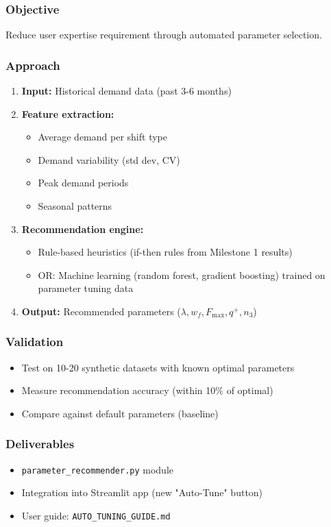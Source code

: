 \documentclass[11pt,letterpaper]{article}
\begin{document}
\subsubsection{Objective}
Reduce user expertise requirement through automated parameter selection.

\subsubsection{Approach}
\begin{enumerate}[leftmargin=*]
    \item \textbf{Input:} Historical demand data (past 3-6 months)
    \item \textbf{Feature extraction:}
    \begin{itemize}[leftmargin=*]
        \item Average demand per shift type
        \item Demand variability (std dev, CV)
        \item Peak demand periods
        \item Seasonal patterns
    \end{itemize}
    \item \textbf{Recommendation engine:}
    \begin{itemize}[leftmargin=*]
        \item Rule-based heuristics (if-then rules from Milestone 1 results)
        \item OR: Machine learning (random forest, gradient boosting) trained on parameter tuning data
    \end{itemize}
    \item \textbf{Output:} Recommended parameters ($\lambda, w_f, F_{\max}, q^+, n_3$)
\end{enumerate}

\subsubsection{Validation}
\begin{itemize}[leftmargin=*]
    \item Test on 10-20 synthetic datasets with known optimal parameters
    \item Measure recommendation accuracy (within 10\% of optimal)
    \item Compare against default parameters (baseline)
\end{itemize}

\subsubsection{Deliverables}
\begin{itemize}[leftmargin=*]
    \item \texttt{parameter\_recommender.py} module
    \item Integration into Streamlit app (new "Auto-Tune" button)
    \item User guide: \texttt{AUTO\_TUNING\_GUIDE.md}
\end{itemize}
\end{document}

